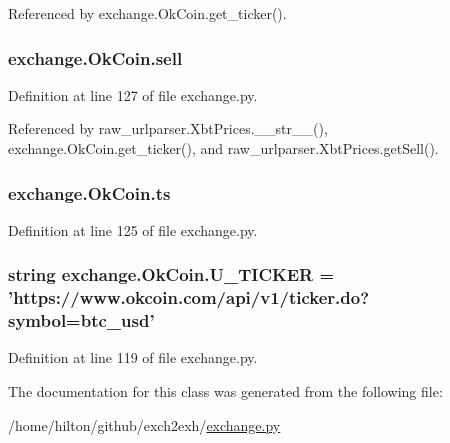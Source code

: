 Referenced by exchange.\-Ok\-Coin.\-get\-\_\-ticker().

\hypertarget{classexchange_1_1_ok_coin_aadb487d2e2f277374a747e1bcb0bd40b}{
\subsubsection[{sell}]{\setlength{\rightskip}{0pt plus 5cm}exchange.\-Ok\-Coin.\-sell}}\label{classexchange_1_1_ok_coin_aadb487d2e2f277374a747e1bcb0bd40b}


Definition at line 127 of file exchange.\-py.



Referenced by raw\-\_\-urlparser.\-Xbt\-Prices.\-\_\-\-\_\-str\-\_\-\-\_\-(), exchange.\-Ok\-Coin.\-get\-\_\-ticker(), and raw\-\_\-urlparser.\-Xbt\-Prices.\-get\-Sell().

\hypertarget{classexchange_1_1_ok_coin_a0fe6263a7f58a6fa8a688929976b7e4a}{
\subsubsection[{ts}]{\setlength{\rightskip}{0pt plus 5cm}exchange.\-Ok\-Coin.\-ts}}\label{classexchange_1_1_ok_coin_a0fe6263a7f58a6fa8a688929976b7e4a}


Definition at line 125 of file exchange.\-py.

\hypertarget{classexchange_1_1_ok_coin_a81305ced2eb23b94feb7195d1d42afc2}{
\subsubsection[{U\-\_\-\-T\-I\-C\-K\-E\-R}]{\setlength{\rightskip}{0pt plus 5cm}string exchange.\-Ok\-Coin.\-U\-\_\-\-T\-I\-C\-K\-E\-R = 'https\-://www.\-okcoin.\-com/api/v1/ticker.\-do?symbol=btc\-\_\-usd'\hspace{0.3cm}{\ttfamily [static]}}}\label{classexchange_1_1_ok_coin_a81305ced2eb23b94feb7195d1d42afc2}


Definition at line 119 of file exchange.\-py.



The documentation for this class was generated from the following file\-:\begin{DoxyCompactItemize}
\item 
/home/hilton/github/exch2exh/\hyperlink{exchange_8py}{exchange.\-py}\end{DoxyCompactItemize}
